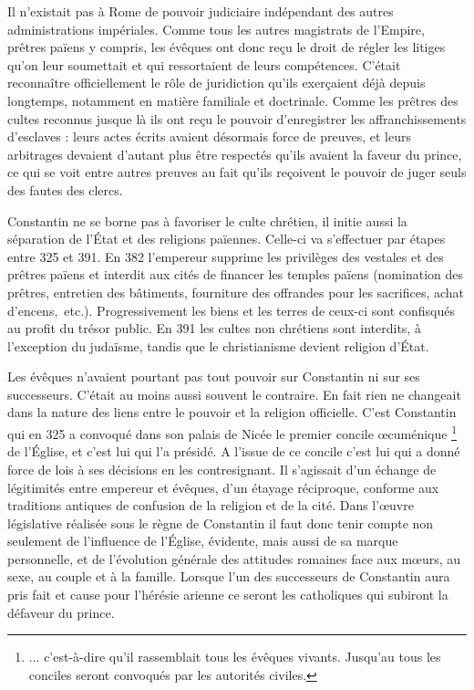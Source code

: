  Il n'existait pas à Rome de pouvoir judiciaire indépendant des autres administrations impériales. Comme tous les autres magistrats de l'Empire, prêtres païens y compris, les évêques ont donc reçu le droit de régler les litiges qu'on leur soumettait et qui ressortaient de leurs compétences. C'était reconnaître officiellement le rôle de juridiction qu'ils exerçaient déjà depuis longtemps, notamment en matière familiale et doctrinale. Comme les prêtres des cultes reconnus jusque là ils ont reçu le pouvoir d'enregistrer les affranchissements d'esclaves : leurs actes écrits avaient désormais force de preuves, et leurs arbitrages devaient d'autant plus être respectés qu'ils avaient la faveur du prince, ce qui se voit entre autres preuves au fait qu'ils reçoivent le pouvoir de juger seuls des fautes des clercs.

 Constantin ne se borne pas à favoriser le culte chrétien, il initie aussi la séparation de l'État et des religions païennes. Celle-ci va s'effectuer par étapes entre 325 et 391. En 382 l'empereur supprime les privilèges des vestales et des prêtres païens et interdit aux cités de financer les temples païens (nomination des prêtres, entretien des bâtiments, fourniture des offrandes pour les sacrifices, achat d'encens,~etc.). Progressivement les biens et les terres de ceux-ci sont confisqués au profit du trésor public. En 391 les cultes non chrétiens sont interdits, à l'exception du judaïsme, tandis que le christianisme devient religion d'État. 

 Les évêques n'avaient pourtant pas tout pouvoir sur Constantin ni sur ses successeurs. C'était au moins aussi souvent le contraire. En fait rien ne changeait dans la nature des liens entre le pouvoir et la religion officielle. C'est Constantin qui en 325 a convoqué dans son palais de Nicée le premier concile œcuménique%
\footnote{... c'est-à-dire qu'il rassemblait tous les évêques vivants. Jusqu'au  tous les conciles seront convoqués par les autorités civiles.} 
de l'Église, et c'est lui qui l'a présidé. A l'issue de ce concile c'est lui qui a donné force de lois à ses décisions en les contresignant. Il s'agissait d'un échange de légitimités entre empereur et évêques, d'un étayage réciproque, conforme aux traditions antiques de confusion de la religion et de la cité. Dans l'œuvre législative réalisée sous le règne de Constantin il faut donc tenir compte non seulement de l'influence de l'Église, évidente, mais aussi de sa marque personnelle, et de l'évolution générale des attitudes romaines face aux mœurs, au sexe, au couple et à la famille. Lorsque l'un des successeurs de Constantin aura pris fait et cause pour l'hérésie arienne ce seront les catholiques qui subiront la défaveur du prince.


